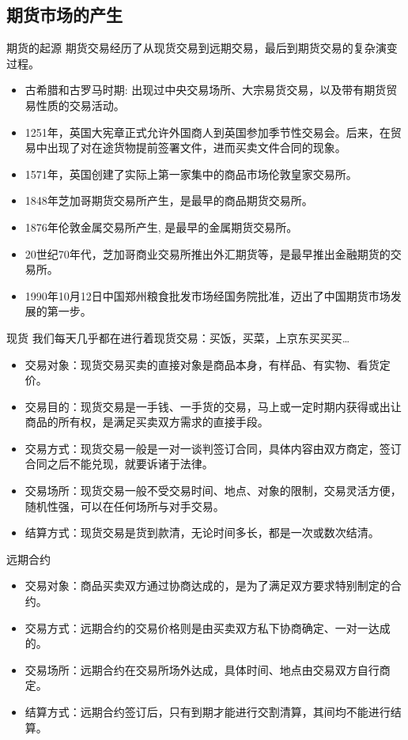 \documentclass{beamer}
\begin{document}
\subsection{期货市场的产生}
\begin{frame}{期货的起源}
  期货交易经历了从现货交易到远期交易，最后到期货交易的复杂演变过程。
  \begin{itemize}
    \item 古希腊和古罗马时期: 出现过中央交易场所、大宗易货交易，以及带有期货贸易性质的交易活动。
    \item 1251年，英国大宪章正式允许外国商人到英国参加季节性交易会。后来，在贸易中出现了对在途货物提前签署文件，进而买卖文件合同的现象。
    \item 1571年，英国创建了实际上第一家集中的商品市场伦敦皇家交易所。
    \item 1848年芝加哥期货交易所产生，是最早的商品期货交易所。
    \item 1876年伦敦金属交易所产生, 是最早的金属期货交易所。
    \item 20世纪70年代，芝加哥商业交易所推出外汇期货等，是最早推出金融期货的交易所。
    \item 1990年10月12日中国郑州粮食批发市场经国务院批准，迈出了中国期货市场发展的第一步。
  \end{itemize}
\end{frame}
\begin{frame}{现货}
  我们每天几乎都在进行着现货交易：买饭，买菜，上京东买买买\ldots
  \begin{itemize}
    \item 交易对象：现货交易买卖的直接对象是商品本身，有样品、有实物、看货定价。
    \item 交易目的：现货交易是一手钱、一手货的交易，马上或一定时期内获得或出让商品的所有权，是满足买卖双方需求的直接手段。
    \item 交易方式：现货交易一般是一对一谈判签订合同，具体内容由双方商定，签订合同之后不能兑现，就要诉诸于法律。
    \item 交易场所：现货交易一般不受交易时间、地点、对象的限制，交易灵活方便，随机性强，可以在任何场所与对手交易。
    \item 结算方式：现货交易是货到款清，无论时间多长，都是一次或数次结清。
  \end{itemize}
\end{frame}
\begin{frame}{远期合约}
  \begin{itemize}
    \item 交易对象：商品买卖双方通过协商达成的，是为了满足双方要求特别制定的合约。 
    \item 交易方式：远期合约的交易价格则是由买卖双方私下协商确定、一对一达成的。 
    \item 交易场所：远期合约在交易所场外达成，具体时间、地点由交易双方自行商定。
    \item 结算方式：远期合约签订后，只有到期才能进行交割清算，其间均不能进行结算。 
  \end{itemize}
\end{frame}
\end{document}
